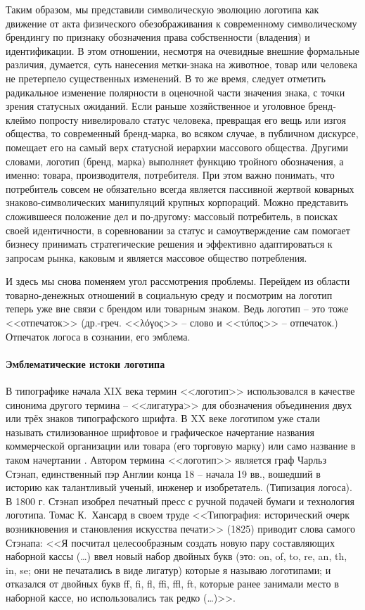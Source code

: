 Таким образом, мы представили символическую эволюцию логотипа как движение
от акта физического обезображивания к современному символическому брендингу по
признаку обозначения  права собственности (владения) и идентификации. В этом отношении,
несмотря на очевидные внешние формальные различия, думается, суть нанесения метки-знака
на животное, товар или человека не претерпело существенных изменений. В то же время,
следует отметить радикальное изменение полярности в оценочной части значения знака,
с точки зрения статусных ожиданий. Если раньше хозяйственное и уголовное бренд-клеймо
попросту нивелировало статус человека, превращая его вещь или изгоя общества, то
современный бренд-марка, во всяком случае, в публичном дискурсе, помещает его
на самый верх статусной иерархии массового общества.  Другими словами, логотип
(бренд, марка) выполняет функцию тройного обозначения, а именно: товара,
производителя, потребителя. При этом важно понимать, что потребитель совсем
не обязательно всегда является пассивной жертвой коварных знаково-символических
манипуляций крупных корпораций. Можно представить сложившееся положение дел и
по-другому: массовый потребитель, в поисках своей идентичности, в соревновании за
статус и самоутверждение сам помогает бизнесу принимать стратегические решения и
эффективно адаптироваться к запросам рынка, каковым и является массовое общество потребления.

И здесь мы снова поменяем угол рассмотрения проблемы. Перейдем из области товарно-денежных
отношений в социальную среду и посмотрим на логотип  теперь уже вне связи с брендом или
товарным знаком. Ведь логотип -- это тоже <<отпечаток>>
(др.-греч. <<\foreignlanguage{greek}{λόγος}>> -- слово
и <<\foreignlanguage{greek}{τύπος}>> -- отпечаток.) Отпечаток логоса в сознании, его эмблема.

\paragraph{Эмблематические  истоки логотипа}
В типографике начала XIX века термин <<логотип>> использовался в качестве синонима
другого термина -- <<лигатура>> для обозначения объединения двух или трёх знаков
типографского шрифта. В XX веке логотипом уже стали называть стилизованное
шрифтовое и графическое начертание названия коммерческой организации или товара
(его торговую марку) или само название в таком начертании \autocite[][50]{lebedev2013logos}. 
Автором термина <<логотип>> является граф Чарльз Стэнап, единственный пэр Англии
конца 18 -- начала 19 вв., вошедший в историю как талантливый ученый, инженер и
изобретатель. (Типизация логоса). В 1800 г. Стэнап изобрел печатный пресс с ручной
подачей бумаги и технология логотипа. Томас К.~Хансард в своем труде <<Типография:
исторический очерк возникновения и становления искусства печати>> (1825) приводит слова
самого Стэнапа: <<Я посчитал целесообразным создать новую пару составляющих наборной
кассы (\ldots) ввел новый набор двойных букв (это: on, of, to, re, an, th, in, se; они
не печатались в виде лигатур) которые я называю логотипами; и отказался от двойных
букв {ff}, {fi}, {fl}, {ffi}, {ffl}, {ft}, которые ранее занимали место в наборной кассе,
но использовались так редко (\ldots)>>\autocite{logotype}.

